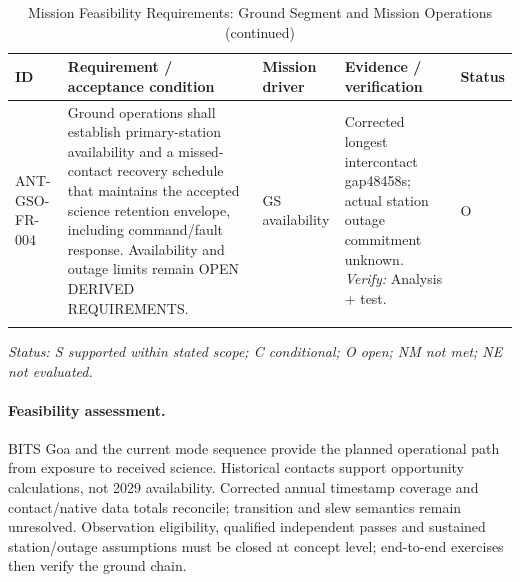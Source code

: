 \begin{table}[H]\centering\small\setlength{\tabcolsep}{3pt}
\ContinuedFloat\captionsetup{list=no}
\caption{Mission Feasibility Requirements: Ground Segment and Mission Operations (continued)}
\begin{tabular}{@{}
>{\RaggedRight\arraybackslash}p{}
>{\RaggedRight\arraybackslash}p{}
>{\RaggedRight\arraybackslash}p{}
>{\RaggedRight\arraybackslash}p{}
>{\RaggedRight\arraybackslash}p{}
@{}}
\toprule ID & Requirement / acceptance condition & Mission driver & Evidence / verification & Status\\\midrule
{}\label{req:ANT-GSO-FR-004}\mbox{ANT-GSO-}\newline\mbox{FR-004} & Ground operations shall establish primary-station availability and a missed-contact recovery schedule that maintains the accepted science retention envelope, including command/fault response. Availability and outage limits remain OPEN DERIVED REQUIREMENTS. & GS availability & Corrected longest intercontact gap48458s; actual station outage commitment unknown. \emph{Verify:} Analysis + test. & O\\
\addlinespace[3pt]
\bottomrule
\end{tabular}
\end{table}
\textit{Status: S supported within stated scope; C conditional; O open; NM not met; NE not evaluated.}
\paragraph{Feasibility assessment.} BITS Goa and the current mode sequence provide the planned operational path from exposure to received science. Historical contacts support opportunity calculations, not 2029 availability. Corrected annual timestamp coverage and contact/native data totals reconcile; transition and slew semantics remain unresolved. Observation eligibility, qualified independent passes and sustained station/outage assumptions must be closed at concept level; end-to-end exercises then verify the ground chain.
